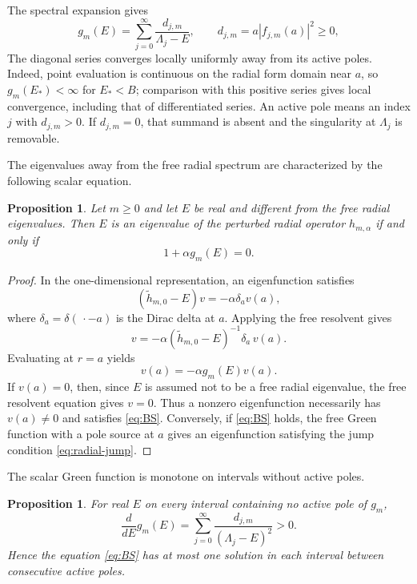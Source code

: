 \documentclass[12pt,a4paper]{article}
\numberwithin{equation}{section}
\newtheorem{prop}[thm]{Proposition}
\theoremstyle{remark}
\theoremstyle{definition}
\begin{document}
The spectral expansion gives
\begin{equation}\label{eq:gspectral}
g_m(E)
=\sum_{j=0}^\infty
\frac{d_{j,m}}{\Lambda_j-E},
\qquad
d_{j,m}=a|f_{j,m}(a)|^2\ge0,
\end{equation}
The diagonal series converges locally uniformly away from its active poles.
Indeed, point evaluation is continuous on the radial form domain near $a$,
so $g_m(E_*)<\infty$ for $E_*<B$; comparison with this positive series gives
local convergence, including that of differentiated series. An active pole
means an index $j$ with $d_{j,m}>0$. If $d_{j,m}=0$, that summand is absent
and the singularity at $\Lambda_j$ is removable.

The eigenvalues away from the free radial spectrum are characterized by the following scalar equation.

\begin{prop}\label{prop:scalar-equation}
Let $m\ge0$ and let $E$ be real and different from the free radial eigenvalues.
Then $E$ is an eigenvalue of the perturbed radial operator $h_{m,\alpha}$ if
and only if
\begin{equation}\label{eq:BS}
1+\alpha g_m(E)=0.
\end{equation}
\end{prop}

\begin{proof}
In the one-dimensional representation, an eigenfunction satisfies
$$
(\widetilde h_{m,0}-E)v
=-\alpha\delta_a v(a),
$$
where $\delta_a=\delta(\,\cdot-a)$ is the Dirac delta at $a$.
Applying the free resolvent gives
$$
v=-\alpha(\widetilde h_{m,0}-E)^{-1}\delta_a\,v(a).
$$
Evaluating at $r=a$ yields
$$
v(a)=-\alpha g_m(E)v(a).
$$
If $v(a)=0$, then, since $E$ is assumed not to be a free radial
eigenvalue, the free resolvent equation gives $v=0$. Thus a nonzero
eigenfunction necessarily has $v(a)\ne0$ and satisfies \eqref{eq:BS}. Conversely, if \eqref{eq:BS} holds, the free Green
function with a pole source at $a$ gives an eigenfunction satisfying the jump
condition \eqref{eq:radial-jump}.
\end{proof}

The scalar Green function is monotone on intervals without active poles.

\begin{prop}\label{prop:monotonicity}
For real $E$ on every interval containing no active pole of $g_m$,
$$
\frac{d}{d E}g_m(E)
=\sum_{j=0}^\infty
\frac{d_{j,m}}{(\Lambda_j-E)^2}>0.
$$
Hence the equation \eqref{eq:BS} has at most one solution in each interval
between consecutive active poles.
\end{prop}
\end{document}
